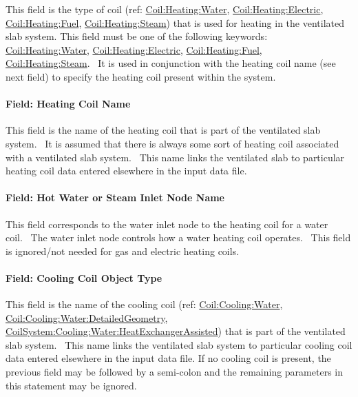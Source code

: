 This field is the type of coil (ref: \hyperref[coilheatingwater]{Coil:Heating:Water}, \hyperref[coilheatingelectric]{Coil:Heating:Electric}, \hyperref[coilheatinggas-000]{Coil:Heating:Fuel}, \hyperref[coilheatingsteam]{Coil:Heating:Steam}) that is used for heating in the ventilated slab system. This field must be one of the following keywords: \hyperref[coilheatingwater]{Coil:Heating:Water}, \hyperref[coilheatingelectric]{Coil:Heating:Electric}, \hyperref[coilheatinggas-000]{Coil:Heating:Fuel}, \hyperref[coilheatingsteam]{Coil:Heating:Steam}.~ It is used in conjunction with the heating coil name (see next field) to specify the heating coil present within the system.

\paragraph{Field: Heating Coil Name}\label{field-heating-coil-name-001}

This field is the name of the heating coil that is part of the ventilated slab system.~ It is assumed that there is always some sort of heating coil associated with a ventilated slab system.~ This name links the ventilated slab to particular heating coil data entered elsewhere in the input data file.

\paragraph{Field: Hot Water or Steam Inlet Node Name}\label{field-hot-water-or-steam-inlet-node-name}

This field corresponds to the water inlet node to the heating coil for a water coil.~ The water inlet node controls how a water heating coil operates.~ This field is ignored/not needed for gas and electric heating coils.

\paragraph{Field: Cooling Coil Object Type}\label{field-cooling-coil-object-type-001}

This field is the name of the cooling coil (ref: \hyperref[coilcoolingwater]{Coil:Cooling:Water}, \hyperref[coilcoolingwaterdetailedgeometry]{Coil:Cooling:Water:DetailedGeometry}, \hyperref[coilsystemcoolingwaterheatexchangerassisted]{CoilSystem:Cooling:Water:HeatExchangerAssisted}) that is part of the ventilated slab system.~ This name links the ventilated slab system to particular cooling coil data entered elsewhere in the input data file. If no cooling coil is present, the previous field may be followed by a semi-colon and the remaining parameters in this statement may be ignored.


